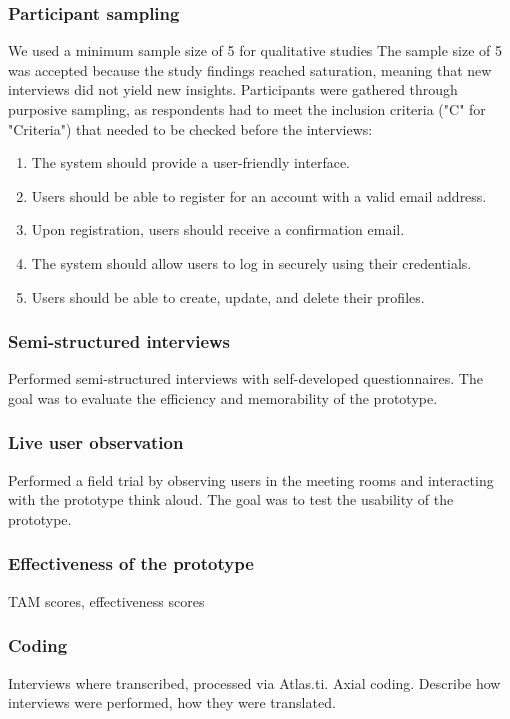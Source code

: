 \subsubsection{Participant sampling}

We used a minimum sample size of 5 for qualitative studies The sample size of 5 was accepted because the study findings reached saturation, meaning that new interviews did not yield new insights. Participants were gathered through purposive sampling, as respondents had to meet the inclusion criteria ("C" for "Criteria") that needed to be checked before the interviews: 

\begin{enumerate}
    \renewcommand{\labelenumi}{C\arabic{enumi}:}
    \item The system should provide a user-friendly interface.
    \item Users should be able to register for an account with a valid email address.
    \item Upon registration, users should receive a confirmation email.
    \item The system should allow users to log in securely using their credentials.
    \item Users should be able to create, update, and delete their profiles.
\end{enumerate}


\subsubsection{Semi-structured interviews}

Performed semi-structured interviews with self-developed questionnaires. The goal was to evaluate the efficiency and memorability of the prototype.


\subsubsection{Live user observation}

Performed a field trial by observing users in the meeting rooms and interacting with the prototype think aloud. The goal was to test the usability of the prototype.

\subsubsection{Effectiveness of the prototype}

TAM scores, effectiveness scores


\subsubsection{Coding}
Interviews where transcribed, processed via Atlas.ti. Axial coding. Describe how interviews were performed, how they were translated.